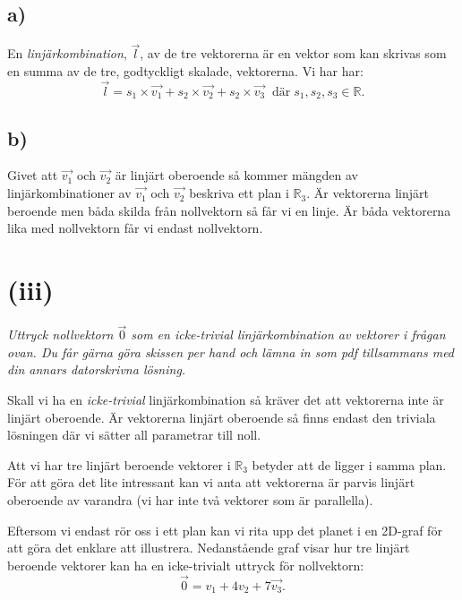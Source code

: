 \documentclass[a4paper, 11pt]{article}
\begin{document}
\subsection*{a)}

En {\em linjärkombination}, $\vec{l}$, av de tre vektorerna är en vektor som kan skrivas som en summa av de tre, godtyckligt skalade, vektorerna. Vi har har:
$$ \vec{l} = s_1\times\vec{v_1} + s_2\times\vec{v_2} + s_2\times\vec{v_3}  \;\; \text{där}\; s_1,s_2,s_3 \in \mathbb{R}.$$

\subsection*{b)}

Givet att $\vec{v_1}$ och $\vec{v_2}$ är linjärt oberoende så kommer
mängden av linjärkombinationer av $\vec{v_1}$ och $\vec{v_2}$ beskriva
ett plan i $\mathbb{R}_3$. Är vektorerna linjärt beroende men båda skilda
från nollvektorn så får vi en linje. Är båda vektorerna lika med
nollvektorn får vi endast nollvektorn. 




\section*{(iii)}

{\em Uttryck nollvektorn $\overrightarrow{0}$ som en icke-trivial linjärkombination av vektorer i frågan ovan.
Du får gärna göra skissen per hand och lämna in som pdf tillsammans med din annars
datorskrivna lösning.}

Skall vi ha en {\em icke-trivial} linjärkombination så kräver det att
vektorerna inte är linjärt oberoende. Är vektorerna linjärt oberoende
så finns endast den triviala lösningen där vi sätter all parametrar
till noll.

Att vi har tre linjärt beroende vektorer i $\mathbb{R}_3$ betyder att
de ligger i samma plan. För att göra det lite intressant kan vi anta
att vektorerna är parvis linjärt oberoende av varandra (vi har
inte två vektorer som är parallella). 


Eftersom vi endast rör oss i ett plan kan vi rita upp det planet i en
2D-graf för att göra det enklare att illustrera. Nedanstående graf
visar hur tre linjärt beroende vektorer kan ha en icke-trivialt uttryck
för nollvektorn:$$ \overrightarrow{0} = v_1 + 4 v_2 + 7 \vec{v_3}.$$
\end{document}
